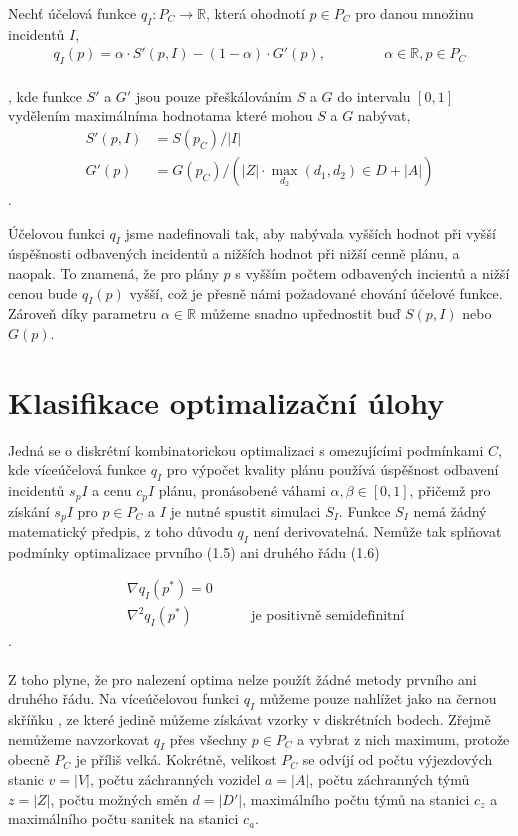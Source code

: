 \begin{definice}
Nechť účelová funkce $q_I \colon P_C \rightarrow \mathbb{R}$, která ohodnotí $p \in P_C$ pro danou množinu incidentů $I$,
  \begin{align}
    q_I(p) = \alpha \cdot S'(p, I) - (1 - \alpha) \cdot G'(p), \hspace{50pt} \alpha \in \mathbb{R}, p \in P_C
  \end{align}
\\
  , kde funkce $S'$ a $G'$ jsou pouze přeškálováním $S$ a $G$ do intervalu $[0, 1]$ vydělením maximálníma hodnotama které mohou $S$ a $G$ nabývat,
  \begin{align}
    S'(p, I) &= S(p_C) / |I| \\
    G'(p) &= G(p_C) / (|Z| \cdot \max_{d_2} (d_1, d_2) \in D + |A|)
  \end{align}
  .
\end{definice}

Účelovou funkci $q_I$ jsme nadefinovali tak, aby nabývala vyšších hodnot při vyšší úspěšnosti odbavených incidentů a nižších hodnot při nižší cenně plánu, a naopak.
To znamená, že pro plány $p$ s vyšším počtem odbavených incientů a nižší cenou bude $q_I(p)$ vyšší, což je přesně námi požadované chování účelové funkce.
Zároveň díky parametru $\alpha \in \mathbb{R}$ můžeme snadno upřednostit buď $S(p, I)$ nebo $G(p)$.

\section{Klasifikace optimalizační úlohy}

Jedná se o diskrétní kombinatorickou optimalizaci s omezujícími podmínkami $C$, kde víceúčelová funkce $q_I$ pro výpočet kvality plánu používá úspěšnost
odbavení incidentů $s_pI$ a cenu $c_pI$ plánu, pronásobené váhami $\alpha, \beta \in [0, 1]$,
přičemž pro získání $s_pI$ pro $p \in P_C$ a $I$ je nutné spustit simulaci $S_I$.
Funkce $S_I$ nemá žádný matematický předpis, z toho důvodu $q_I$ není derivovatelná.
Nemůže tak splňovat podmínky optimalizace prvního (1.5) ani druhého řádu (1.6) %

\begin{align}
  &\nabla q_I(p^*) = 0 \\
  &\nabla^2 q_I(p^*) \hspace{50pt} \text{je positivně semidefinitní}
\end{align}
.
\\
\\
Z toho plyne, že pro nalezení optima nelze použít žádné metody prvního ani druhého řádu. %
Na víceúčelovou funkci $q_I$ můžeme pouze nahlížet jako na černou skříňku %
, ze které jedině můžeme získávat vzorky v diskrétních bodech.
Zřejmě nemůžeme navzorkovat $q_I$ přes všechny $p \in P_C$ a vybrat z nich maximum, protože obecně $P_C$ je příliš velká.
Kokrétně, velikost $P_C$ se odvíjí od počtu výjezdových stanic $v = |V|$, počtu záchranných vozidel $a = |A|$, počtu záchranných týmů $z = |Z|$, počtu možných směn $d = |D'|$, 
maximálního počtu týmů na stanici $c_z$ a maximálního počtu sanitek na stanici $c_a$.

